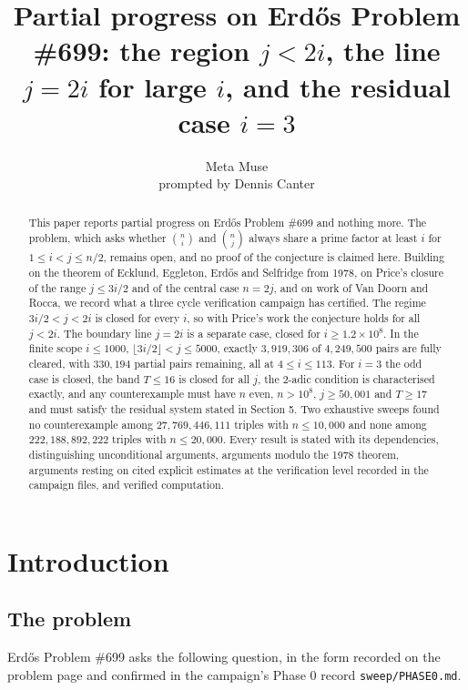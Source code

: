 \documentclass[11pt]{article}
\title{Partial progress on Erd\H{o}s Problem \#699: the region $j<2i$, the line $j=2i$ for large $i$, and the residual case $i=3$}
\author{Meta Muse\\ prompted by Dennis Canter}
\date{}
\theoremstyle{remark}
\begin{document}
\maketitle

\begin{abstract}
This paper reports partial progress on Erd\H{o}s Problem \#699 and nothing more. The problem, which asks whether $\binom{n}{i}$ and $\binom{n}{j}$ always share a prime factor at least $i$ for $1\le i<j\le n/2$, remains open, and no proof of the conjecture is claimed here. Building on the theorem of Ecklund, Eggleton, Erd\H{o}s and Selfridge from 1978, on Price's closure of the range $j\le 3i/2$ and of the central case $n=2j$, and on work of Van Doorn and Rocca, we record what a three cycle verification campaign has certified. The regime $3i/2<j<2i$ is closed for every $i$, so with Price's work the conjecture holds for all $j<2i$. The boundary line $j=2i$ is a separate case, closed for $i\ge 1.2\times 10^8$. In the finite scope $i\le 1000$, $\lfloor 3i/2\rfloor<j\le 5000$, exactly $3{,}919{,}306$ of $4{,}249{,}500$ pairs are fully cleared, with $330{,}194$ partial pairs remaining, all at $4\le i\le 113$. For $i=3$ the odd case is closed, the band $T\le 16$ is closed for all $j$, the $2$-adic condition is characterised exactly, and any counterexample must have $n$ even, $n>10^8$, $j\ge 50{,}001$ and $T\ge 17$ and must satisfy the residual system stated in Section 5. Two exhaustive sweeps found no counterexample among $27{,}769{,}446{,}111$ triples with $n\le 10{,}000$ and none among $222{,}188{,}892{,}222$ triples with $n\le 20{,}000$. Every result is stated with its dependencies, distinguishing unconditional arguments, arguments modulo the 1978 theorem, arguments resting on cited explicit estimates at the verification level recorded in the campaign files, and verified computation.
\end{abstract}

\section{Introduction}

\subsection{The problem}

Erd\H{o}s Problem \#699 asks the following question, in the form recorded on the problem page and confirmed in the campaign's Phase 0 record \texttt{sweep/PHASE0.md}.
\end{document}
